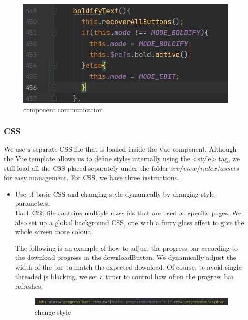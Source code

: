 \documentclass[11pt]{article}
\begin{document}
\begin{spacing}{1.0}
	\begin{figure}[H]
	\centering
	\includegraphics[scale=.3]{figures/componentsRefs.png}
	\caption{component communication}
	\label{fig:9}
\end{figure}
	\subsubsection{CSS}
	We use a separate CSS file that is loaded inside the Vue component. Although the Vue template allows us to define styles internally using the <style> tag, we still load all the CSS placed separately under the folder $src/view/index/assets$ for easy management. For CSS, we have three instructions.
	\begin{itemize}
		\item Use of basic CSS and changing style dynamically by changing style parameters.\\
		Each CSS file contains multiple class ids that are used on specific pages. We also set up a global background CSS, one with a furry glass effect to give the whole screen more colour.
		
		The following is an example of how to adjust the progress bar according to the download progress in the downloadButton. We dynamically adjust the width of the bar to match the expected download. Of course, to avoid single-threaded js blocking, we set a timer to control how often the progress bar refreshes.
\begin{figure}[H]
	\centering
	\includegraphics[scale=.5]{figures/css.png}
	\caption{change style}
	\label{fig:10}
\end{figure}


\end{itemize}
\end{spacing}
\end{document}

